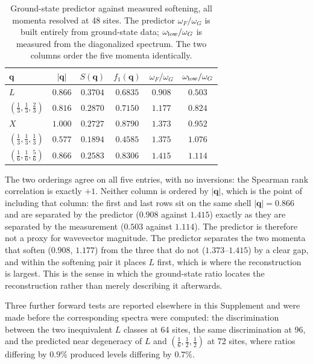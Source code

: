 \documentclass[
aps,
prl,
onecolumn,
amsmath,
amssymb,
superscriptaddress,
longbibliography
]{revtex4-2}
\newcommand{\bq}{\bm q}
\begin{document}
\begin{table}[h]
\caption{Ground-state predictor against measured softening, all
momenta resolved at 48 sites. The predictor $\omega_F/\omega_G$ is
built entirely from ground-state data; $\omega_{\rm low}/\omega_G$ is
measured from the diagonalized spectrum. The two columns order the
five momenta identically.}
\label{tab:rank}
\begin{ruledtabular}
\begin{tabular}{lccccc}
$\bq$ & $|\bq|$ & $S(\bq)$ & $f_1(\bq)$ & $\omega_F/\omega_G$ &
$\omega_{\rm low}/\omega_G$\\
\hline
$L$ & $0.866$ & $0.3704$ & $0.6835$ & $0.908$ & $0.503$\\
$(\frac13,\frac13,\frac23)$ & $0.816$ & $0.2870$ & $0.7150$ & $1.177$
 & $0.824$\\
$X$ & $1.000$ & $0.2727$ & $0.8790$ & $1.373$ & $0.952$\\
$(\frac13,\frac13,\frac13)$ & $0.577$ & $0.1894$ & $0.4585$ & $1.375$
 & $1.076$\\
$(\frac16,\frac16,\frac56)$ & $0.866$ & $0.2583$ & $0.8306$ & $1.415$
 & $1.114$\\
\end{tabular}
\end{ruledtabular}
\end{table}

The two orderings agree on all five entries, with no inversions: the
Spearman rank correlation is exactly $+1$. Neither column is ordered
by $|\bq|$, which is the point of including that column: the first and
last rows sit on the same shell $|\bq|=0.866$ and are separated by the
predictor ($0.908$ against $1.415$) exactly as they are separated by
the measurement ($0.503$ against $1.114$). The predictor is therefore
not a proxy for wavevector magnitude. The predictor separates the
two momenta that soften ($0.908$, $1.177$) from the three that do not
($1.373$--$1.415$) by a clear gap, and within the softening pair it
places $L$ first, which is where the reconstruction is largest. This
is the sense in which the ground-state ratio locates the
reconstruction rather than merely describing it afterwards.

Three further forward tests are reported elsewhere in this
Supplement and were made before the corresponding spectra were
computed: the discrimination between the two inequivalent $L$ classes
at 64 sites, the same discrimination at 96, and the predicted near
degeneracy of $L$ and $(\frac16,\frac12,\frac12)$ at 72 sites, where
ratios differing by $0.9\%$ produced levels differing by $0.7\%$.
\end{document}
